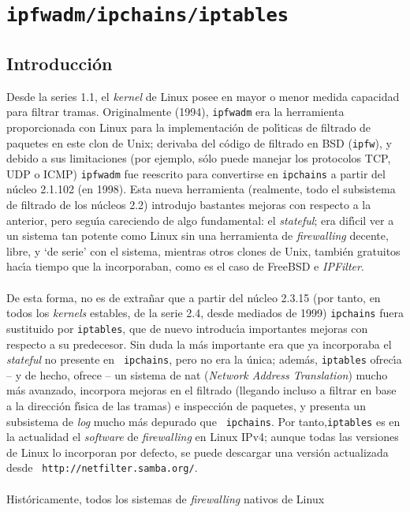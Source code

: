 \section{\tt ipfwadm/ipchains/iptables}
\subsection{Introducci\'on}
Desde la series 1.1, el {\it kernel} de Linux posee en mayor o menor medida 
capacidad para filtrar tramas. Originalmente (1994), {\tt ipfwadm} era la 
herramienta proporcionada con Linux para la implementaci\'on de pol\'{\i}ticas 
de filtrado de paquetes en este clon de Unix; derivaba del c\'odigo de filtrado 
en BSD ({\tt ipfw}), y debido a sus limitaciones (por ejemplo, s\'olo puede 
manejar los protocolos TCP, UDP o ICMP) {\tt ipfwadm} fue reescrito para 
convertirse en {\tt ipchains} a partir del n\'ucleo 2.1.102 (en 1998). Esta
nueva herramienta (realmente, todo el subsistema de filtrado de los n\'ucleos
2.2) introdujo bastantes mejoras con respecto a la anterior, pero segu\'{\i}a
careciendo de algo fundamental: el {\it stateful}; era dif\'{\i}cil ver a un
sistema tan potente como Linux sin una herramienta de {\it firewalling} decente,
libre, y `de serie' con el sistema, mientras otros clones de Unix, tambi\'en 
gratuitos hac\'{\i}a tiempo que la incorporaban, como es el caso de FreeBSD e 
{\it IPFilter}.\\
\\De esta forma, no es de extra\~nar que a partir del n\'ucleo 2.3.15 (por 
tanto, en todos los {\it kernels} estables, de la serie 2.4, desde mediados de 
1999) {\tt ipchains} fuera sustituido por {\tt iptables}, que de nuevo 
introduc\'{\i}a importantes mejoras con respecto a su predecesor. Sin duda la
m\'as importante era que ya incorporaba el {\it stateful} no presente en {\tt
ipchains}, pero no era la \'unica; adem\'as, {\tt iptables} ofrec\'{\i}a -- y
de hecho, ofrece -- un sistema de {\sc nat} ({\it Network Address Translation}) 
mucho m\'as avanzado, incorpora mejoras en el filtrado (llegando incluso a
filtrar en base a la direcci\'on f\'{\i}sica de las tramas) e inspecci\'on de
paquetes, y presenta un subsistema de {\it log} mucho m\'as depurado que {\tt
ipchains}. Por tanto,{\tt iptables} es en la actualidad el {\it software} de 
{\it firewalling} en Linux IPv4; aunque todas las versiones de Linux lo 
incorporan por defecto, se puede descargar una versi\'on actualizada desde {\tt 
http://netfilter.samba.org/}.\\
\\Hist\'oricamente, todos los sistemas de {\it firewalling} nativos de Linux 
